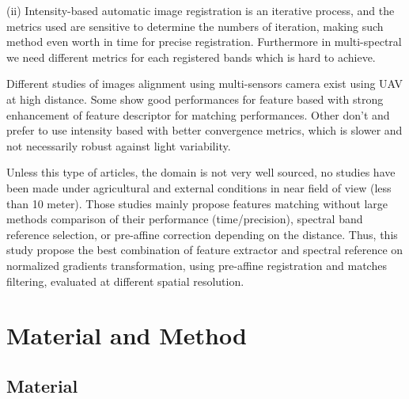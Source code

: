 \documentclass[]{elsarticle}
\begin{document}
	(ii) Intensity-based automatic image registration is an iterative process, and the metrics used are sensitive to determine the numbers of iteration,
	making such method even worth in time for precise registration. Furthermore in multi-spectral we need different metrics for each registered bands which is hard to achieve.
	\\
	\par Different studies of images alignment using multi-sensors camera exist using UAV at high distance.
	Some show good performances for feature based \cite{DantasDiasJunior, Vakalopoulou} with strong enhancement of feature descriptor for matching performances.
	Other don't and prefer to use intensity based \cite{douarre:hal-02183837} with better convergence metrics, which is slower and not necessarily robust against light variability.
	\\
	\par Unless this type of articles, the domain is not very well sourced, no studies have been made under agricultural and external conditions in near field of view (less than 10 meter).
	Those studies mainly propose features matching without large methods comparison of their performance (time/precision),
	spectral band reference selection, or pre-affine correction depending on the distance.
	Thus, this study propose the best combination of feature extractor and spectral reference on normalized gradients transformation,
	using pre-affine registration and matches filtering, evaluated at different spatial resolution.
	
	\section{Material and Method}
	
	\subsection{Material}
	
\end{document}
